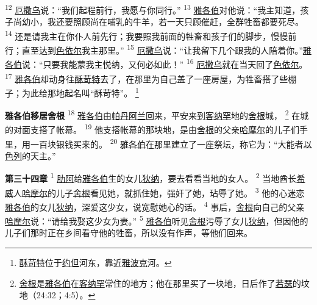 \textsuperscript{12}
\uline{厄撒乌}说：“我们起程前行，我愿与你同行。”
\textsuperscript{13}
\uline{雅各伯}对他说：“我主知道，孩子尚幼小，我还要照顾尚在哺乳的牛羊，若一天只顾催赶，全群牲畜都要死尽。
\textsuperscript{14}
还是请我主在你仆人前先行；我要照我前面的牲畜和孩子们的脚步，慢慢前行；直至达到\uline{色依尔}我主那里。”
\textsuperscript{15}
\uline{厄撒乌}说：“让我留下几个跟我的人陪着你。”\uline{雅各伯}说：“只要我能蒙我主悦纳，又何必如此！”
\textsuperscript{16}
\uline{厄撒乌}就在当天回了\uline{色依尔}。
\textsuperscript{17}
\uline{雅各伯}却动身往\uline{酥苛特}去了，在那里为自己盖了一座房屋，为牲畜搭了些棚子；为此给那地起名叫“酥苛特”。
\footnote{\uline{酥苛特}位于\uline{约但}河东，靠近\uline{雅波克}河。}

\textbf{雅各伯移居舍根\quad}
\textsuperscript{18}
\uline{雅各伯}由\uline{帕丹}\uline{阿兰}回来，平安来到\uline{客纳罕}地的\uline{舍根}城，
\footnote{\uline{舍根}是\uline{雅各伯}在\uline{客纳罕}常住的地方；他在那里买了一块地，日后作了\uline{若瑟}的坟地（24:32；4:5）。}
在城的对面支搭了帐幕。
\textsuperscript{19}
他支搭帐幕的那块地，是由\uline{舍根}的父亲\uline{哈摩尔}的儿子们手里，用一百块银钱买来的。
\textsuperscript{20}
\uline{雅各伯}在那里建立了一座祭坛，称它为：“大能者\uline{以色列}的天主。”

\textbf{第三十四章\quad}
\textsuperscript{1}
\uline{肋阿}给\uline{雅各伯}生的女儿\uline{狄纳}，要去看看当地的女人。
\textsuperscript{2}
当地酋长\uline{希威}人\uline{哈摩尔}的儿子\uline{舍根}看见她，就抓住她，强奸了她，玷辱了她。
\textsuperscript{3}
他的心迷恋\uline{雅各伯}的女儿\uline{狄纳}，深爱这少女，说宽慰她心的话。
\textsuperscript{4}
事后，\uline{舍根}向自己的父亲\uline{哈摩尔}说：“请给我娶这少女为妻。”
\textsuperscript{5}
\uline{雅各伯}听见\uline{舍根}污辱了女儿\uline{狄纳}，但因他的儿子们那时正在乡间看守他的牲畜，所以没有作声，等他们回来。

